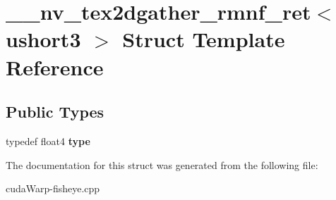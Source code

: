 \hypertarget{struct____nv__tex2dgather__rmnf__ret_3_01ushort3_01_4}{}\section{\+\_\+\+\_\+nv\+\_\+tex2dgather\+\_\+rmnf\+\_\+ret$<$ ushort3 $>$ Struct Template Reference}
\label{struct____nv__tex2dgather__rmnf__ret_3_01ushort3_01_4}
\subsection*{Public Types}
\begin{DoxyCompactItemize}
\item 
typedef float4 {\bfseries type}\hypertarget{struct____nv__tex2dgather__rmnf__ret_3_01ushort3_01_4_a57a90eb39007fadba94d356707b36948}{}\label{struct____nv__tex2dgather__rmnf__ret_3_01ushort3_01_4_a57a90eb39007fadba94d356707b36948}

\end{DoxyCompactItemize}


The documentation for this struct was generated from the following file\+:\begin{DoxyCompactItemize}
\item 
cuda\+Warp-\/fisheye.\+cpp\end{DoxyCompactItemize}
